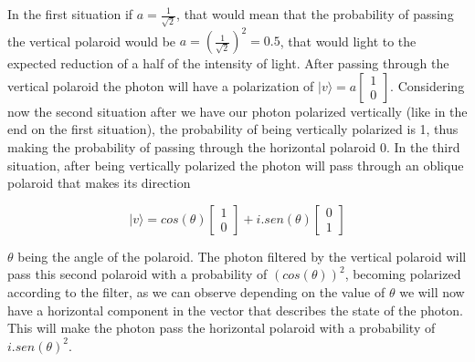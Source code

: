 In the first situation if $a = \frac{1}{\sqrt{2}}$, that would mean that the probability of passing the vertical polaroid would be $a = (\frac{1}{\sqrt{2}})^{2} = 0.5$, that would light to the expected reduction of a half of the intensity of light. After passing through the vertical polaroid the photon will have a polarization of $\vert v \rangle = a\left[\begin{array}{c}
1\\
0
\end{array}\right]$. Considering now the second situation after we have our photon polarized vertically (like in the end on the first situation), the probability of being vertically polarized is 1, thus making the probability of passing through the horizontal polaroid 0.
In the third situation, after being vertically polarized the photon will pass through an oblique polaroid that makes its direction

\begin{equation}
\vert v \rangle =  cos(\theta)\left[\begin{array}{c}
1\\
0
\end{array}\right]+ i.sen(\theta)\left[\begin{array}{c}
0\\
1
\end{array}\right]
\end{equation}



$\theta$ being the angle of the polaroid. The photon filtered by the vertical polaroid will pass this second polaroid with a probability of $(cos(\theta))^{2}$, becoming polarized according to the filter, as we can observe depending on the value of $\theta$ we will now have a horizontal component in the vector that describes the state of the photon. This will make the photon pass the horizontal polaroid  with a probability of $i.sen(\theta)^{2}$. 




















